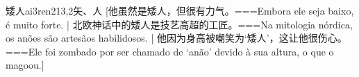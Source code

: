 \begin{EntryWithPhonetic}{矮人}{ai3ren2}{13,2}{⽮、⼈}
  [他虽然是矮人，但很有力气。===Embora ele seja baixo, é muito forte. | 北欧神话中的矮人是技艺高超的工匠。===Na mitologia nórdica, os anões são artesãos habilidosos. | 他因为身高被嘲笑为‘矮人’，这让他很伤心。===Ele foi zombado por ser chamado de ‘anão’ devido à sua altura, o que o magoou.]
\end{EntryWithPhonetic}

